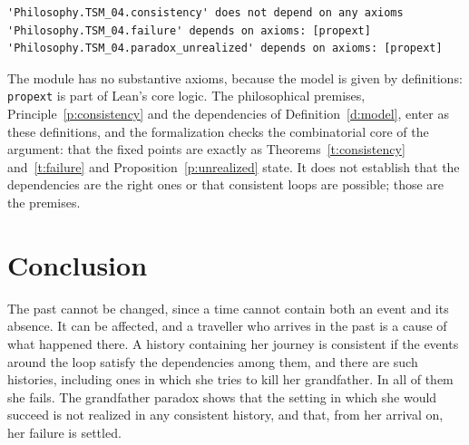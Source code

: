 \documentclass{situationist-preprint}
\begin{document}
\begin{lstlisting}
'Philosophy.TSM_04.consistency' does not depend on any axioms
'Philosophy.TSM_04.failure' depends on axioms: [propext]
'Philosophy.TSM_04.paradox_unrealized' depends on axioms: [propext]
\end{lstlisting}

The module has no substantive axioms, because the model is given by definitions: \texttt{propext} is part of Lean's core logic. The philosophical premises, Principle~\ref{p:consistency} and the dependencies of Definition~\ref{d:model}, enter as these definitions, and the formalization checks the combinatorial core of the argument: that the fixed points are exactly as Theorems~\ref{t:consistency} and~\ref{t:failure} and Proposition~\ref{p:unrealized} state. It does not establish that the dependencies are the right ones or that consistent loops are possible; those are the premises.

\section{Conclusion}

The past cannot be changed, since a time cannot contain both an event and its absence. It can be affected, and a traveller who arrives in the past is a cause of what happened there. A history containing her journey is consistent if the events around the loop satisfy the dependencies among them, and there are such histories, including ones in which she tries to kill her grandfather. In all of them she fails. The grandfather paradox shows that the setting in which she would succeed is not realized in any consistent history, and that, from her arrival on, her failure is settled.
\end{document}
